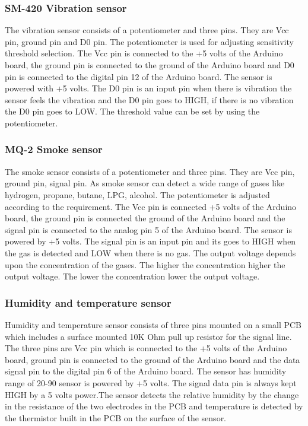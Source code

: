 \subsubsection{SM-420 Vibration sensor}
The vibration sensor consists of a potentiometer and three pins. They are Vcc pin, ground pin and D0 pin. The potentiometer is used for adjusting sensitivity threshold selection. The Vcc pin is connected to the +5 volts of the Arduino board, the ground pin is connected to the ground of the Arduino board and D0 pin is connected to the digital pin 12 of the Arduino board. The sensor is powered with +5 volts. The D0 pin is an input pin when there is vibration the sensor feels the vibration and the D0 pin goes to HIGH, if there is no vibration the D0 pin goes to LOW. The threshold value can be set by using the potentiometer.
\subsubsection{MQ-2 Smoke sensor}
The smoke sensor consists of a potentiometer and three pins. They are Vcc pin, ground pin, signal pin. As smoke sensor can detect a wide range of gases like hydrogen, propane, butane, LPG, alcohol. The potentiometer is adjusted according to the requirement. The Vcc pin is connected +5 volts of the Arduino board, the ground pin is connected the ground of the Arduino board and the signal pin is connected to the analog pin 5 of the Arduino board. The sensor is powered by +5 volts. The signal pin is an input pin and its goes to HIGH when the gas is detected and LOW when there is no gas. The output voltage depends upon the concentration of the gases. The higher the concentration higher the output voltage. The lower the concentration lower the output voltage.
\subsubsection{Humidity and temperature sensor}
Humidity and temperature sensor consists of three pins mounted on a small PCB which includes a surface mounted 10K Ohm pull up resistor for the signal line. The three pins are Vcc pin which is connected to the +5 volts of the Arduino board, ground pin is connected to the ground of the Arduino board and the data signal pin to the digital pin 6 of the Arduino board. The sensor has humidity range of 20-90%
sensor is powered by +5 volts. The signal data pin is always kept HIGH by a 5 volts power.The sensor detects the relative humidity by the change in the resistance of the two electrodes in the PCB and temperature is detected by the thermistor built in the PCB on the surface of the sensor.
